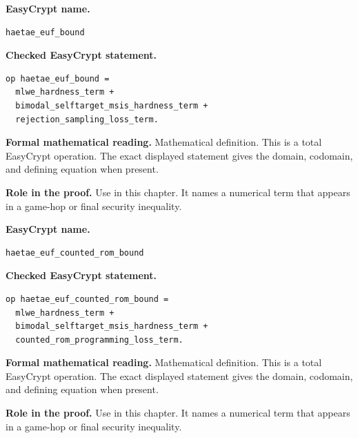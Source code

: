 \begin{formaldefinition}
\noindent\textbf{EasyCrypt name.}
\begin{lstlisting}[language=EasyCrypt,basicstyle=\ttfamily\scriptsize]
haetae_euf_bound
\end{lstlisting}
\noindent\textbf{Checked EasyCrypt statement.}
\begin{lstlisting}[language=EasyCrypt,basicstyle=\ttfamily\scriptsize]
op haetae_euf_bound =
  mlwe_hardness_term +
  bimodal_selftarget_msis_hardness_term +
  rejection_sampling_loss_term.
\end{lstlisting}
\noindent\textbf{Formal mathematical reading.}
Mathematical definition. This is a total EasyCrypt operation.  The exact displayed statement gives the domain, codomain, and defining equation when present.

\noindent\textbf{Role in the proof.}
Use in this chapter. It names a numerical term that appears in a game-hop or final security inequality.

\end{formaldefinition}

\begin{formaldefinition}
\noindent\textbf{EasyCrypt name.}
\begin{lstlisting}[language=EasyCrypt,basicstyle=\ttfamily\scriptsize]
haetae_euf_counted_rom_bound
\end{lstlisting}
\noindent\textbf{Checked EasyCrypt statement.}
\begin{lstlisting}[language=EasyCrypt,basicstyle=\ttfamily\scriptsize]
op haetae_euf_counted_rom_bound =
  mlwe_hardness_term +
  bimodal_selftarget_msis_hardness_term +
  counted_rom_programming_loss_term.
\end{lstlisting}
\noindent\textbf{Formal mathematical reading.}
Mathematical definition. This is a total EasyCrypt operation.  The exact displayed statement gives the domain, codomain, and defining equation when present.

\noindent\textbf{Role in the proof.}
Use in this chapter. It names a numerical term that appears in a game-hop or final security inequality.

\end{formaldefinition}

